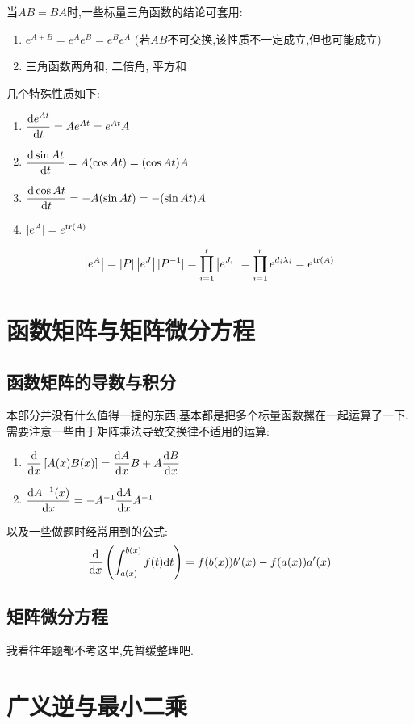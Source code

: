\documentclass{matrix-review}
\begin{document}
当$AB=BA$时,一些标量三角函数的结论可套用:
\begin{enumerate}
    \item $e^{A+B}=e^Ae^B=e^Be^A$ (若$AB$不可交换,该性质不一定成立,但也可能成立)
    \item 三角函数两角和, 二倍角, 平方和
\end{enumerate}

几个特殊性质如下:
\begin{enumerate}
    \item $\dfrac{\mathrm{d} e^{At}}{\mathrm{d} t}=Ae^{At}=e^{At}A$
    \item $\dfrac{\mathrm{d} \sin At}{\mathrm{d} t}=A(\cos At)=(\cos At)A$
    \item $\dfrac{\mathrm{d} \cos At}{\mathrm{d} t}=-A(\sin At)=-(\sin At)A$
    \item $|e^{A}|=e^{\mathrm{tr}\left(A\right)}$ \important
\end{enumerate}
\begin{remarkbox}
    $$\left|e^A\right| = |P|\left|e^J\right||P^{-1}|= \prod_{i=1}^{r}\left|e^{J_i}\right| = \prod_{i=1}^{r} e^{d_i\lambda_i} = e^{\mathrm{tr}\left(A\right)}$$
\end{remarkbox}


\section{函数矩阵与矩阵微分方程}

\subsection{函数矩阵的导数与积分}
本部分并没有什么值得一提的东西,基本都是把多个标量函数摞在一起运算了一下. 需要注意一些由于矩阵乘法导致交换律不适用的运算:
\begin{enumerate}
    \item $\dfrac{\mathrm{d} }{\mathrm{d} x}\left[A(x)B(x)\right]=\dfrac{\mathrm{d} A}{\mathrm{d} x}B+A\dfrac{\mathrm{d} B}{\mathrm{d} x}$
    \item $\dfrac{\mathrm{d} A^{-1}(x)}{\mathrm{d} x}=-A^{-1}\dfrac{\mathrm{d} A}{\mathrm{d} x}A^{-1}$
\end{enumerate}
以及一些做题时经常用到的公式:
\begin{equation}
    \dfrac{\mathrm{d} }{\mathrm{d} x}\left(\int_{a(x)}^{b(x)}f(t)\mathrm{d} t\right) = f(b(x))b'(x) - f(a(x))a'(x)
\end{equation}

\subsection{矩阵微分方程}
\sout{我看往年题都不考这里,先暂缓整理吧.}


\section{广义逆与最小二乘}
\end{document}

